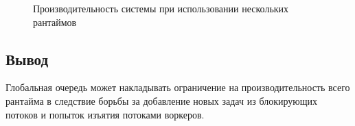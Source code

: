 \begin{figure}[H]
    \begin{center}
    \end{center}

    \caption{Производительность системы при использовании нескольких рантаймов}
    \label{fig:tatlin:multi_rt:eval}
\end{figure}

\subsection{Вывод}

Глобальная очередь может накладывать ограничение на производительность всего рантайма в следствие борьбы за добавление новых задач из блокирующих потоков и попыток изъятия потоками воркеров.
